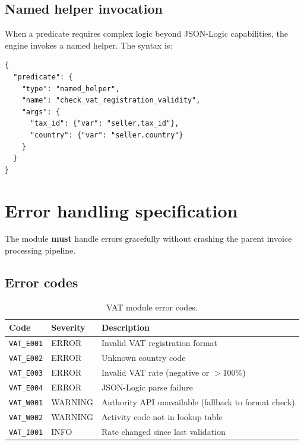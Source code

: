 \subsection{Named helper invocation}

When a predicate requires complex logic beyond JSON-Logic capabilities,
the engine invokes a named helper. The syntax is:

\begin{lstlisting}[basicstyle=\ttfamily\small,caption={Named helper invocation in rule predicate.}]
{
  "predicate": {
    "type": "named_helper",
    "name": "check_vat_registration_validity",
    "args": {
      "tax_id": {"var": "seller.tax_id"},
      "country": {"var": "seller.country"}
    }
  }
}
\end{lstlisting}

\section{Error handling specification}

The module \textbf{must} handle errors gracefully without crashing the
parent invoice processing pipeline.

\subsection{Error codes}

\begin{table}[htbp]
\centering
\caption{VAT module error codes.}
\label{tab:vat-errors}
\footnotesize
\begin{tabularx}{\linewidth}{@{}l l X@{}}
\toprule
\textbf{Code} & \textbf{Severity} & \textbf{Description} \\ \midrule
\texttt{VAT\_E001} & ERROR & Invalid VAT registration format \\
\texttt{VAT\_E002} & ERROR & Unknown country code \\
\texttt{VAT\_E003} & ERROR & Invalid VAT rate (negative or $>$100\%) \\
\texttt{VAT\_E004} & ERROR & JSON-Logic parse failure \\
\texttt{VAT\_W001} & WARNING & Authority API unavailable (fallback to format check) \\
\texttt{VAT\_W002} & WARNING & Activity code not in lookup table \\
\texttt{VAT\_I001} & INFO & Rate changed since last validation \\
\bottomrule
\end{tabularx}
\end{table}

